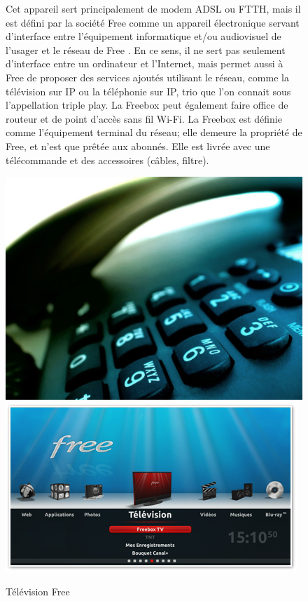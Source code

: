 \begin{figure}[htbp]
\begin{minipage}{0.65\linewidth}
Cet appareil sert principalement de modem ADSL ou FTTH, mais il est défini par la société Free comme \og un appareil électronique servant d'interface entre l'équipement informatique et/ou audiovisuel de l'usager et le réseau de Free \fg. En ce sens, il ne sert pas seulement d'interface entre un ordinateur et l'Internet, mais permet aussi à Free de proposer des services ajoutés utilisant le réseau, comme la télévision sur IP ou la téléphonie sur IP, trio que l'on connait sous l'appellation triple play. La Freebox peut également faire office de routeur et de point d'accès sans fil Wi-Fi. La Freebox est définie comme l'équipement terminal du réseau; elle demeure la propriété de Free, et n'est que prêtée aux abonnés. Elle est livrée avec une télécommande et des accessoires (câbles, filtre).
\end{minipage}
\hfill
\begin{minipage}[c]{.30\linewidth}
\begin{center}
\includegraphics[width=\linewidth]{img/telephone.jpg}
\includegraphics[width=\linewidth]{img/tv-free.png}
\caption{Télévision Free}
\label{fig:image2}
\end{center}
\end{minipage}
\end{figure}

